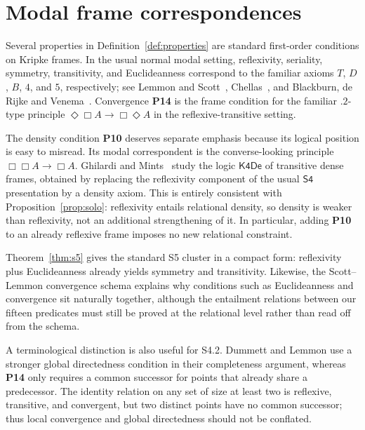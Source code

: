 \documentclass[11pt,a4paper,reqno]{amsart}
\theoremstyle{definition}
\theoremstyle{remark}
\newcommand{\prop}[1]{\textbf{P#1}}
\begin{document}
\section{Modal frame correspondences}\label{sec:modal}

Several properties in Definition~\ref{def:properties} are standard first-order
conditions on Kripke frames.  In the usual normal modal setting, reflexivity,
seriality, symmetry, transitivity, and Euclideanness correspond to the
familiar axioms $T$, $D$, $B$, $4$, and $5$, respectively; see Lemmon and
Scott~\cite{LemmonScott1977}, Chellas~\cite{Chellas1980}, and Blackburn,
de Rijke and Venema~\cite{BlackburnEtAl2001}.  Convergence \prop{14} is the
frame condition for the familiar $\mathsf{.2}$-type principle
$\Diamond\Box A\to\Box\Diamond A$ in the reflexive-transitive setting.

The density condition \prop{10} deserves separate emphasis because its logical
position is easy to misread.  Its modal correspondent is the converse-looking
principle $\Box\Box A\to\Box A$.  Ghilardi and Mints~\cite{GhilardiMints2014}
study the logic $\mathsf{K4De}$ of transitive dense frames, obtained by
replacing the reflexivity component of the usual $\mathsf{S4}$ presentation by
a density axiom.  This is entirely consistent with Proposition~\ref{prop:solo}:
reflexivity entails relational density, so density is weaker than reflexivity,
not an additional strengthening of it.  In particular, adding \prop{10} to an
already reflexive frame imposes no new relational constraint.

Theorem~\ref{thm:s5} gives the standard S5 cluster in a compact form:
reflexivity plus Euclideanness already yields symmetry and transitivity.
Likewise, the Scott--Lemmon convergence schema explains why conditions such as
Euclideanness and convergence sit naturally together, although the
entailment relations between our fifteen predicates must still be proved at the
relational level rather than read off from the schema.

A terminological distinction is also useful for S4.2.  Dummett and Lemmon
\cite{DummettLemmon1959} use a stronger global directedness condition in their
completeness argument, whereas \prop{14} only requires a common successor for
points that already share a predecessor.  The identity relation on any set of
size at least two is reflexive, transitive, and convergent, but two distinct
points have no common successor; thus local convergence and global directedness
should not be conflated.
\end{document}
